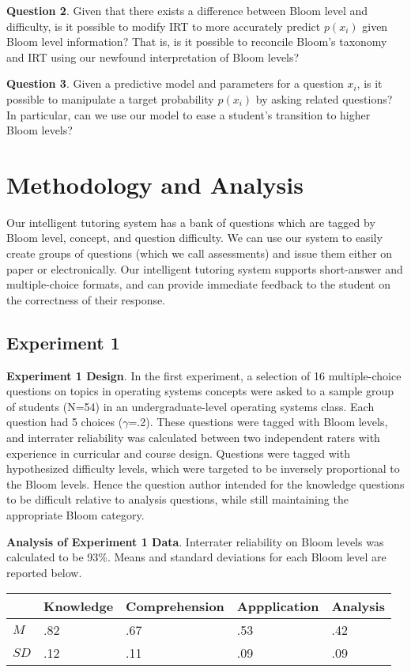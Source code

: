 \documentclass[]{interact}
\theoremstyle{plain}
\theoremstyle{definition}
\theoremstyle{remark}
\begin{document}
\textbf{Question 2}. Given that there exists a difference between Bloom level
and difficulty, is it possible to modify IRT to more accurately predict
$p(x_i)$ given Bloom level information?  That is, is it possible to reconcile
Bloom's taxonomy and IRT using our newfound interpretation of Bloom levels?

\textbf{Question 3}. Given a predictive model and parameters for a question
$x_i$, is it possible to manipulate a target probability $p(x_i)$ by asking
related questions?  In particular, can we use our model to ease a student's
transition to higher Bloom levels?

\section{Methodology and Analysis}

Our intelligent tutoring system has a bank of questions which are tagged by
Bloom level, concept, and question difficulty.  We can use our system to easily
create groups of questions (which we call assessments) and issue them either on
paper or electronically.  Our intelligent tutoring system supports short-answer
and multiple-choice formats, and can provide immediate feedback to the student
on the correctness of their response.

\subsection{Experiment 1}

\textbf{Experiment 1 Design}. In the first experiment, a selection of 16
multiple-choice questions on topics in operating systems concepts were asked to
a sample group of students (N=54) in an undergraduate-level operating systems
class.  Each question had 5 choices ($\gamma$=.2). These questions were tagged
with Bloom levels, and interrater reliability was calculated between two
independent raters with experience in curricular and course design.  Questions
were tagged with hypothesized difficulty levels, which were targeted to be
inversely proportional to the Bloom levels.  Hence the question author intended
for the knowledge questions to be difficult relative to analysis questions,
while still maintaining the appropriate Bloom category.


\textbf{Analysis of Experiment 1 Data}.  Interrater reliability on Bloom levels
was calculated to be 93\%.  Means and standard deviations for each Bloom level
are reported below.

\begin{center}
\begin{tabular}{|l|l|l|l|l|}
                                                                 \hline
      &   Knowledge & Comprehension & Appplication & Analysis \\ \hline
 $M$  &  .82 & .67 & .53 & .42  \\ \hline
$SD$  &  .12 & .11 & .09 & .09  \\ \hline
\end{tabular}
\end{center}
\end{document}
